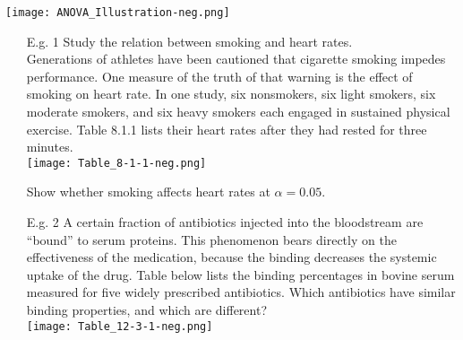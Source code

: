 \begin{frame}
	\centering
	\texttt{[image: ANOVA\_Illustration-neg.png]}
\end{frame}
\begin{frame}

	\begin{enumerate}
		\item[E.g. 1] Study the relation between smoking and heart rates.\\[1em]
Generations of athletes have been cautioned that cigarette smoking impedes
performance. One measure of the truth of that warning is the effect of smoking
on heart rate. In one study, six nonsmokers, six light smokers, six moderate
smokers, and six heavy smokers each engaged in sustained physical exercise.
Table 8.1.1 lists their heart rates after they had rested for three minutes.
\\[1em]
\texttt{[image: Table\_8-1-1-neg.png]}
\item[] Show whether smoking affects heart rates at $\alpha=0.05$.
	\end{enumerate}
\end{frame}
\begin{frame}
	\begin{enumerate}
		\item[E.g. 2] A certain fraction of antibiotics injected into the bloodstream are ``bound'' to
serum proteins. This phenomenon bears directly on the effectiveness of the
medication, because the binding decreases the systemic uptake of the drug.
Table below lists the binding percentages in bovine serum measured for five
widely prescribed antibiotics. Which antibiotics have similar binding
properties, and which are different? \\[1em]
\texttt{[image: Table\_12-3-1-neg.png]}
	\end{enumerate}
\end{frame}

